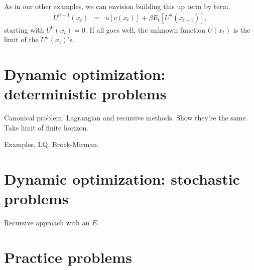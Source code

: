 \documentclass[11pt]{article}
\begin{document}
As in our other examples, we can envision building this up term by term,
\begin{eqnarray*}
    U^{n+1}(x_t) &=&  u[c(x_{t})] + \beta E_t [U^n(x_{t+1})] ,
\end{eqnarray*}
starting with $U^0(x_t) = 0$.
If all goes well,
the unknown function $U(x_t)$ is the limit of the $U^n(x_t)$'s.


\section{Dynamic optimization:  deterministic problems}


Canonical problem, Lagrangian and recursive methods.
Show they're the same.
Take limit of finite horizon.

Examples.  LQ, Brock-Mirman.



\section{Dynamic optimization:  stochastic problems}

Recursive approach with an $E$.



\section*{Practice problems}
\end{document}
